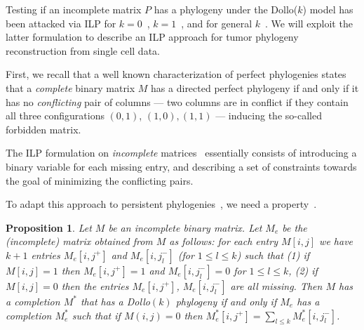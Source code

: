 \documentclass[a4paper,USenglish]{article}
\newtheorem{proposition}[theorem]{Proposition}
\theoremstyle{definition}
\begin{document}
Testing if an incomplete matrix $P$ has a phylogeny under the Dollo($k$) model has been
attacked via ILP for $k=0$~\cite{Gusfield2007}, $k=1$~\cite{gusfield_persistent_2015}, and
for general $k$~\cite{Bonizzoni:2017:BPP:3107411.3107441}.
We will exploit the latter formulation to describe an ILP approach for tumor phylogeny
reconstruction from single cell data.


First, we recall that a  well  known characterization  of perfect  phylogenies states
that a \emph{complete}
binary matrix $M$ has a directed perfect phylogeny if and only if
it has  no \emph{conflicting}  pair of columns ---  two columns  are in
conflict  if  they contain  all  three configurations  $(0,1)$,
$(1,0), (1,1)$ --- inducing the so-called forbidden matrix.

The ILP formulation on \emph{incomplete} matrices~\cite{Gusfield2007} essentially consists
of introducing a binary variable for each missing entry, and describing a set of
constraints towards the goal of minimizing the conflicting pairs. 

To adapt this approach to persistent phylogenies~\cite{gusfield_persistent_2015}, we need 
a property~\cite{Bonizzoni:2017:BPP:3107411.3107441}.

\begin{proposition}
  \label{proposition:extended matrix}
  Let $M$ be an incomplete binary matrix.
  Let $M_{e}$ be the (incomplete) matrix obtained from $M$ as follows:
  for each entry $M[i,j]$ we have $k+1$ entries $M_{e}[i,j^{+}]$ and
$M_{e}[i,j_{l}^{-}]$ (for $1\le l\le k$) such that (1) if $M[i,j] = 1$ then $M_{e}[i,j^{+}] = 1$ and
$M_{e}[i,j_{l}^{-}] = 0$ for $1\le l\le k$, (2) if $M[i,j] = 0$ then the entries
$M_{e}[i,j^{+}]$, $ M_{e}[i,j_{l}^{-}]$ are all missing.
Then $M$ has a completion $M^{*}$ that has a Dollo$(k)$ phylogeny if and only if $M_{e}$
has a completion $M^{*}_{e}$ such that if $M(i,j)= 0$ then $M^{*}_{e}[i,j^{+}] = \sum_{l\le
  k} M^{*}_{e}[i,j_{l}^{-}]$.
\end{proposition}
\end{document}
